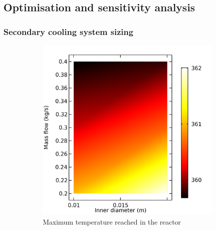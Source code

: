 \subsection{Optimisation and sensitivity analysis}

\subsubsection{Secondary cooling system sizing}

\begin{figure}[h]
    \centering

    \begin{subfigure}{0.49\linewidth}
        \includegraphics[width=\linewidth]{figures/S2-maxT.png}
        \caption{Maximum temperature reached in the reactor}
        \label{fig:comsol-S2:maxT}
    \end{subfigure}
    \begin{subfigure}{0.49\linewidth}

\end{subfigure}
\end{figure}

